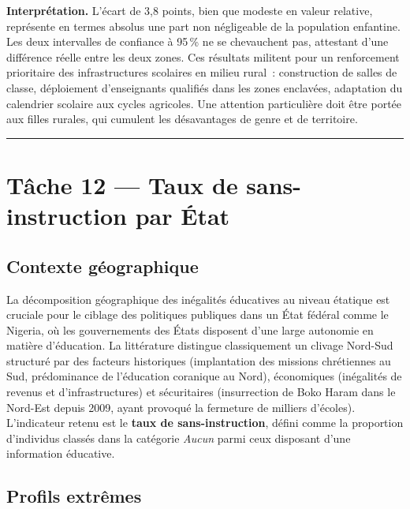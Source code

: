 \documentclass[
]{article}
\begin{document}
\begin{interpretbox}
\textbf{Interprétation.} L'écart de 3{,}8 points, bien que modeste en valeur relative, représente en termes absolus une part non négligeable de la population enfantine. Les deux intervalles de confiance à 95\,\% ne se chevauchent pas, attestant d'une différence réelle entre les deux zones. Ces résultats militent pour un renforcement prioritaire des infrastructures scolaires en milieu rural~: construction de salles de classe, déploiement d'enseignants qualifiés dans les zones enclavées, adaptation du calendrier scolaire aux cycles agricoles. Une attention particulière doit être portée aux filles rurales, qui cumulent les désavantages de genre et de territoire.
\end{interpretbox}

\begin{center}\rule{0.5\linewidth}{0.5pt}\end{center}

\section{Tâche 12 --- Taux de sans-instruction par
État}\label{tuxe2che-12-taux-de-sans-instruction-par-uxe9tat}

\subsection{Contexte géographique}\label{contexte-guxe9ographique}

La décomposition géographique des inégalités éducatives au niveau
étatique est cruciale pour le ciblage des politiques publiques dans un
État fédéral comme le Nigeria, où les gouvernements des États disposent
d'une large autonomie en matière d'éducation. La littérature distingue
classiquement un clivage Nord-Sud structuré par des facteurs historiques
(implantation des missions chrétiennes au Sud, prédominance de
l'éducation coranique au Nord), économiques (inégalités de revenus et
d'infrastructures) et sécuritaires (insurrection de Boko Haram dans le
Nord-Est depuis 2009, ayant provoqué la fermeture de milliers d'écoles).
L'indicateur retenu est le \textbf{taux de sans-instruction}, défini
comme la proportion d'individus classés dans la catégorie \emph{Aucun}
parmi ceux disposant d'une information éducative.

\subsection{Profils extrêmes}\label{profils-extruxeames}
\end{document}
